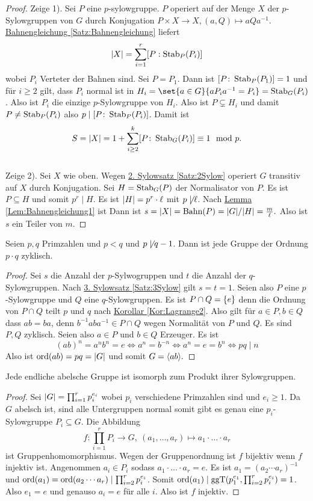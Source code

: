 \begin{proof}
    Zeige 1). Sei $P$ eine $p$-sylowgruppe. $P$ operiert auf der Menge $X$ der $p$-Sylowgruppen von $G$ durch Konjugation $P\times X\to X, (a,Q)\mapsto aQa^{-1}$.
    \hyperref[Satz:Bahnengleichung]{Bahnengleichung \ref{Satz:Bahnengleichung}} liefert
    $$\lvert X\rvert=\sum_{i=1}^r[P:\operatorname{Stab}_P(P_i)]$$ wobei $P_i$ Verteter der Bahnen sind. Sei $P=P_1$. Dann ist $[P\colon\operatorname{Stab}_P(P_1)]=1$ und für $i\geq 2$ gilt, dass $P_i$ normal ist in $H_i=\set{a\in G}{aP_ia^{-1}=P_i}=\Stab_G(P_i)$. Also ist $P_i$ die einzige $p$-Sylowgruppe von $H_i$. Also ist $P\subsetneq H_i$ und damit $P\neq \operatorname{Stab}_P(P_i)$ also $p\mid [P\colon\operatorname{Stab}_P(P_i)]$. Damit ist $$S=\lvert X\rvert=1+\sum_{i\geq 2}^k[P\colon \operatorname{Stab}_G(P_i)]\equiv 1\mod p.$$\\
    Zeige 2). Sei $X$ wie oben. Wegen \hyperref[Satz:2Sylow]{2. Sylowsatz \ref{Satz:2Sylow}} operiert $G$ transitiv auf $X$ durch Konjugation.
    Sei $H=\operatorname{Stab}_G(P)$ der Normalisator von $P$. Es ist $P\subseteq H$ und somit $p^r\mid H$. Es ist $\lvert H\rvert=p^r\cdot \ell$ mit $p\not\mid \ell$. Nach \hyperref[Lem:Bahnengleichung1]{Lemma \ref{Lem:Bahnengleichung1}} ist
    Dann ist $s=\lvert X\rvert=\text{Bahn}(P)=\lvert G\rvert/\lvert H\rvert=\frac{m}{\ell}.$ Also ist $s$ ein Teiler von $m$.
\end{proof}
\begin{Satz}
    Seien $p,q$ Primzahlen und $p<q$  und $p\not\mid q-1$. Dann ist jede Gruppe der Ordnung $p\cdot q$ zyklisch.
\end{Satz}
\begin{proof}
    Sei $s$ die Anzahl der $p$-Sylwogruppen und $t$ die Anzahl der $q$-Sylowgruppen. Nach \hyperref[Satz:3Sylow]{3. Sylowsatz \ref{Satz:3Sylow}} gilt $s=t=1.$ Seien also $P$ eine $p$-Sylowgruppe und $Q$ eine $q$-Sylowgruppen.
    Es ist $P\cap Q=\{e\}$ denn die Ordnung von $P\cap Q$ teilt $p$ und $q$ nach \hyperref[Kor:Lagrange2]{Korollar \ref{Kor:Lagrange2}}. Also gilt für $a\in P, b\in Q$ dass $ab=ba$, denn $b^{-1}aba^{-1}\in P\cap Q$ wegen Normalität von $P$ und $Q$. Es sind $P,Q$ zyklisch. Seien also $a\in P$ und $b\in Q$ Erzeuger. Es ist 
    $$(ab)^n=a^nb^n=e\iff a^n=b^{-n}\iff a^n=e=b^n\iff pq\mid n$$
    Also ist $\operatorname{ord}(ab)=pq=\lvert G\rvert$ und somit $G=\langle ab\rangle.$
\end{proof}
\begin{Lemma}
    Jede endliche abelsche Gruppe ist isomorph zum Produkt ihrer Sylowgruppen.
\end{Lemma}
\begin{proof}
    Sei $\lvert G\rvert=\prod_{i=1}^rp_i^{e_i}$ wobei $p_i$ verschiedene Primzahlen sind und $e_i\geq 1$.
    Da $G$ abelsch ist, sind alle Untergruppen normal somit gibt es genau eine $p_i$-Sylowgruppe $P_i\subseteq G$. Die Abbildung 
    $$f\colon\prod_{i=1}^rP_i\to G,\ (a_1,\dots,a_r)\mapsto a_1\cdot\dots\cdot a_r$$ ist Gruppenhomomorphismus. Wegen der Gruppenordnung ist $f$ bijektiv wenn $f$ injektiv ist. Angenommen $a_i\in P_i$ sodass $a_1\cdot\dots\cdot a_r=e$. Es ist $a_1=(a_2\cdots a_r)^{-1}$ und $\operatorname{ord}(a_1)=\operatorname{ord}(a_2\cdots a_r)\mid\prod_{i=2}^rp_i^{e_i}$.
    Somit $\operatorname{ord}(a_1)\mid \operatorname{ggT}(p_1^{e_1},\prod_{i=2}^rp_i^{e_i})=1$. Also $e_1=e$ und genauso $a_i=e$ für alle $i$. Also ist $f$ injektiv.
\end{proof}
